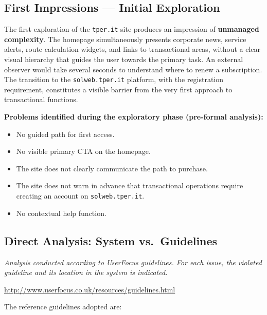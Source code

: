 ﻿\documentclass[11pt,a4paper]{article}
\begin{document}
\subsection*{First Impressions --- Initial Exploration}

\noindent The first exploration of the \texttt{tper.it} site produces
an impression of \textbf{unmanaged complexity}. The homepage simultaneously
presents corporate news, service alerts, route calculation
widgets, and links to transactional areas, without a clear visual
hierarchy that guides the user towards the primary task. An external
observer would take several seconds to understand where to renew a
subscription. The transition to the \texttt{solweb.tper.it} platform,
with the registration requirement, constitutes a visible barrier
from the very first approach to transactional functions.

\noindent\textbf{Problems identified during the exploratory phase (pre-formal analysis):}

\begin{itemize}
    \item No guided path for first access.
    \item No visible primary CTA on the homepage.
    \item The site does not clearly communicate the path to purchase.
    \item The site does not warn in advance that transactional
    operations require creating an account on
    \texttt{solweb.tper.it}.
    \item No contextual help function.
\end{itemize}

\subsection*{Direct Analysis: System vs.\ Guidelines}

\noindent\textit{Analysis conducted according to UserFocus guidelines. For each issue, the violated guideline and its location in the system is indicated.}\\[2pt]
\raggedright\url{http://www.userfocus.co.uk/resources/guidelines.html}\par

\bigskip

\noindent The reference guidelines adopted are:
\end{document}
